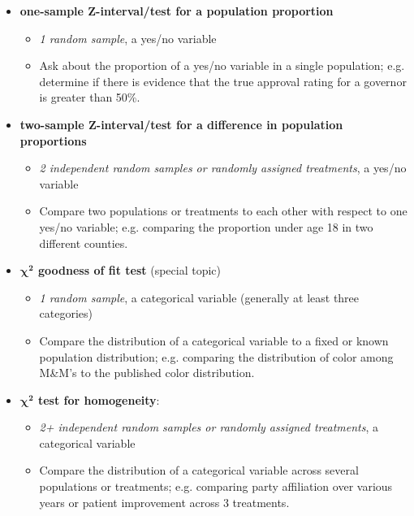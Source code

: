 \begin{itemize}\vspace{-2mm}
\setlength{\itemsep}{0mm}
\item \textbf{one-sample Z-interval/test for a population proportion }
\begin{itemize}\vspace{-1mm}
\setlength{\itemsep}{0mm}
\item \emph{1 random sample}, a yes/no variable
\item Ask about the proportion of a yes/no variable in a single population; e.g. determine if there is evidence that the true approval rating for a governor is greater than 50\%.  
\end{itemize}

\item \textbf{two-sample Z-interval/test for a difference in population proportions }
\begin{itemize}\vspace{-2mm}
\setlength{\itemsep}{0mm}
\item \emph{2 independent random samples or randomly assigned treatments}, a yes/no variable
\item Compare two populations or treatments to each other with respect to one yes/no variable; e.g. comparing the proportion under age 18 in two different counties.
\end{itemize}

\item \textbf{$\pmb{\chi^2}$ goodness of fit test} (special topic)
\begin{itemize}\vspace{-2mm}
\setlength{\itemsep}{0mm}
\item \emph{1 random sample}, a categorical variable (generally at least three categories)
\item Compare the distribution of a categorical variable to a fixed or known population distribution; e.g. comparing the distribution of color among M\&M's to the published color distribution. 
\end{itemize}

\item \textbf{$\pmb{\chi^2}$ test for homogeneity}: 
\begin{itemize}\vspace{-2mm}
\setlength{\itemsep}{0mm}
\item \emph{2+ independent random samples or randomly assigned treatments}, a categorical variable
\item Compare the distribution of a categorical variable across several populations or treatments; e.g. comparing party affiliation over various years or patient improvement across 3 treatments.
\end{itemize}


\end{itemize}
